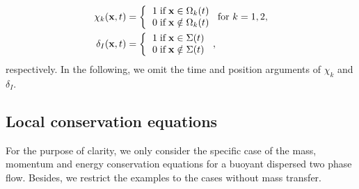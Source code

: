 \begin{align}
    \chi_k(\textbf{x},t) &=  \left\{
      \begin{tabular}{cc}
        $1 \;\text{if} \;\textbf{x} \in \Omega_k(t)$\\
        $0 \;\text{if} \;\textbf{x} \notin \Omega_k(t)$
      \end{tabular}
      \right.
      \text{for $k = 1,2$},
      \label{eq:PIF}\\
    \delta_I(\textbf{x},t) &=  \left\{
      \begin{tabular}{cc}
        $1 \;\text{if} \;\textbf{x} \in \Sigma(t)$\\
        $0 \;\text{if} \;\textbf{x} \notin \Sigma(t)$
      \end{tabular}
      \right.,
      \label{eq:PIF_I}
\end{align}
respectively. 
In the following, we omit the time and position arguments of $\chi_k$ and $\delta_I$. 

\subsection{Local conservation equations}
\label{sec:local_eq}

For the purpose of clarity, we only consider the specific case of the mass, momentum and energy conservation equations for a buoyant dispersed two phase flow.
Besides, we restrict the examples to the cases without mass transfer.

